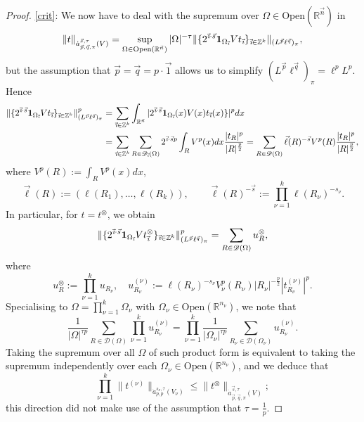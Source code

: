 \documentclass[11pt, reqno]{amsart}
\theoremstyle{definition}
\theoremstyle{remark}
\numberwithin{equation}{section}
\newcommand{\D}{\mathscr D}
\newcommand{\R}{\mathbb R}
\newcommand{\Z}{\mathbb Z}
\newcommand{\vone}{\vec 1}
\newcommand{\vi}{\vec{\textit{\i}}}
\newcommand{\vell}{\vec\ell}
\newcommand{\vn}{\vec n}
\newcommand{\vp}{\vec p}
\newcommand{\vq}{\vec q}
\newcommand{\vs}{\vec s}
\newcommand{\atau}{\dot a^{\vs,\tau}_{\vp,\vq,\pi}}
\newcommand{\one}{\mathbf{1}}
\newcommand{\abs}[1]{|#1|}
\newcommand{\Norm}[2]{\|#1\|_{#2}}
\newcommand{\Open}{\mathrm{Open}}
\begin{document}
\begin{proof}
\eqref{crit}: We now have to deal with the supremum over $\Omega\in\Open(\R^{\vn})$ in
\begin{equation*}
\Norm{t}{\atau(V)}=\sup_{\Omega\in\Open(\R^{\vn})} \abs{\Omega}^{-\tau}\Norm{\{2^{\vi\cdot\vs}\one_{\Omega_{\vi}}V t_{\vi}\}_{\vi\in\Z^k}}{(L^{\vp}\ell^{\vq})_\pi},
\end{equation*}
but the assumption that $\vp=\vq=p\cdot\vone$ allows us to simplify $(L^{\vp}\ell^{\vq})_\pi=\ell^p L^p$. Hence
\begin{align*}
\Norm{\{2^{\vi\cdot\vs}\one_{\Omega_{\vi}}Vt_{\vi}\}_{\vi\in\Z^k}}{(L^{\vp}\ell^{\vq})_\pi}^p
&=\sum_{\vi\in\Z^k}\int_{\R^{\vn}}\abs{2^{\vi\cdot\vs}\one_{\Omega_{\vi}}(x)V(x)t_{\vi}(x)\}}^p dx \\
&=\sum_{\vi\in\Z^k}\sum_{R\in\D_{\vi}(\Omega)} 2^{\vi\cdot\vs p}\int_R V^p(x)dx \frac{\abs{t_R}^p }{ \abs{R}^{\frac{p}{2}} }
=\sum_{R\in\D(\Omega)} \vell(R)^{-\vs}V^p(R)\frac{\abs{t_R}^p }{ \abs{R}^{\frac{p}{2}} },
\end{align*}
where $V^p(R):=\int_R V^p(x)dx$,
\begin{equation*}
\vell(R):=(\ell(R_1),\ldots,\ell(R_k)),\qquad
\vell(R)^{-\vs}:=\prod_{\nu=1}^k \ell(R_\nu)^{-s_\nu}.
\end{equation*}
In particular, for $t=t^{\otimes}$, we obtain
\begin{equation*}
\Norm{\{2^{\vi\cdot\vs}\one_{\Omega_{\vi}}Vt^{\otimes}_{\vi}\}_{\vi\in\Z^k}}{(L^{\vp}\ell^{\vq})_\pi}^p
=\sum_{R\in\D(\Omega)} u^{\otimes}_R,
\end{equation*}
where
\begin{equation*}
u^{\otimes}_R:=\prod_{\nu=1}^k u_{R_\nu},\quad
u_{R_\nu}^{(\nu)}:=   \ell(R_\nu)^{-s_\nu}V_\nu^p(R_\nu)\abs{R_\nu}^{-\frac{p}{2}}\abs{t^{(\nu)}_{R_\nu}}^p.
\end{equation*}
Specialising to $\Omega=\prod_{\nu=1}^k\Omega_\nu$ with $\Omega_\nu\in\Open(\R^{n_\nu})$, we note that
\begin{equation*}
\frac{1}{\abs{\Omega}^{\tau p}}\sum_{R\in\D(\Omega)} \prod_{\nu=1}^k u_{R_\nu}^{(\nu)}
=\prod_{\nu=1}^k\frac{1}{\abs{\Omega_\nu}^{\tau p}}\sum_{R_\nu\in\D(\Omega_\nu)} u_{R_\nu}^{(\nu)}.
\end{equation*}
Taking the supremum over all $\Omega$ of such product form is equivalent to taking the supremum independently over each $\Omega_\nu\in\Open(\R^{n_\nu})$, and we deduce that
\begin{equation}\label{prod-vs-tensor}
\prod_{\nu=1}^k\Norm{t^{(\nu)}}{\dot a^{s_\nu,\tau}_{p,p}(V_\nu)}
\leq\Norm{t^{\otimes}}{\atau(V)};
\end{equation}
this direction did not make use of the assumption that $\tau=\frac1p$.


\end{proof}
\end{document}

